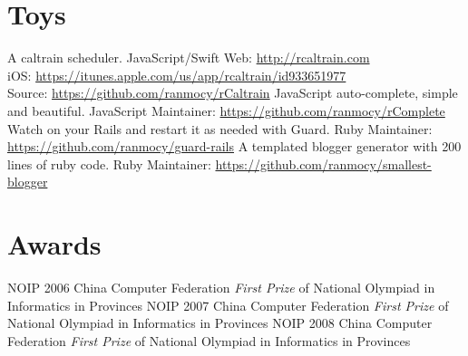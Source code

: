 \documentclass[]{friggeri-cv} %
\begin{document}

\section{Toys}

\begin{entrylist}
  {A caltrain scheduler.}
  {JavaScript/Swift}
  {
  Web: \url{http://rcaltrain.com}\\
  iOS: \url{https://itunes.apple.com/us/app/rcaltrain/id933651977}\\
  Source: \url{https://github.com/ranmocy/rCaltrain}
  }
  {JavaScript auto-complete, simple and beautiful.}
  {JavaScript}
  {
  Maintainer: \url{https://github.com/ranmocy/rComplete}
  }
  {Watch on your Rails and restart it as needed with Guard.}
  {Ruby}
  {
  Maintainer: \url{https://github.com/ranmocy/guard-rails}
  }
  {A templated blogger generator with 200 lines of ruby code.}
  {Ruby}
  {
  Maintainer: \url{https://github.com/ranmocy/smallest-blogger}
  }
\end{entrylist}


\section{Awards}

\begin{entrylist}
  {NOIP 2006}
  {China Computer Federation}
  {\emph{First Prize} of National Olympiad in Informatics in Provinces}
  {NOIP 2007}
  {China Computer Federation}
  {\emph{First Prize} of National Olympiad in Informatics in Provinces}
  {NOIP 2008}
  {China Computer Federation}
  {\emph{First Prize} of National Olympiad in Informatics in Provinces}
\end{entrylist}
\end{document}
